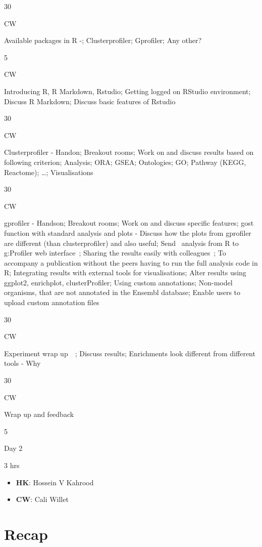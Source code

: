 \documentclass[
]{book}
\providecommand{\tightlist}{%
  \setlength{\itemsep}{0pt}\setlength{\parskip}{0pt}}
\begin{document}
30

CW

Available packages in R -; Clusterprofiler; Gprofiler; Any other?

5

CW

Introducing R, R Markdown, Rstudio; Getting logged on RStudio environment; Discuss R Markdown; Discuss basic features of Rstudio

30

CW

Clusterprofiler - Handon; Breakout rooms; Work on and discuss results based on following criterion; Analysis; ORA; GSEA; Ontologies; GO; Pathway (KEGG, Reactome); \ldots; Visualisations

30

CW

gprofiler - Handson; Breakout rooms; Work on and discuss specific features; gost function with standard analysis and plots - Discuss how the plots from gprofiler are different (than clusterprofiler) and also useful; Send~ analysis from R to g:Profiler web interface~; Sharing the results easily with colleagues~; To accompany a publication without the peers having to run the full analysis code in R; Integrating results with external tools for visualisations; Alter results using ggplot2, enrichplot, clusterProfiler; Using custom annotations; Non-model organisms, that are not annotated in the Ensembl database; Enable users to upload custom annotation files

30

CW

Experiment wrap up~~; Discuss results; Enrichments look different from different tools - Why

30

CW

Wrap up and feedback

5

Day 2

3 hrs

\begin{itemize}
\tightlist
\item
  \textbf{HK}: Hossein V Kahrood
\item
  \textbf{CW}: Cali Willet
\end{itemize}

\hypertarget{recap}{%
\chapter{Recap}\label{recap}}
\end{document}
